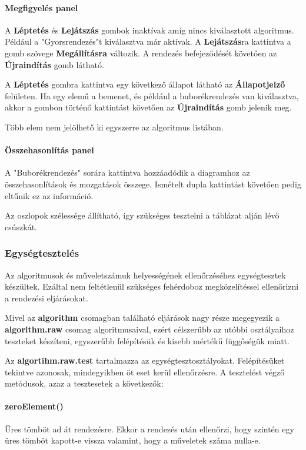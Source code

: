 \documentclass{elteikthesis}
\begin{document}
\paragraph{Megfigyelés panel}
A \textbf{Léptetés} és \textbf{Lejátszás} gombok inaktívak amíg nincs kiválasztott algoritmus. Például a "Gyorsrendezés"t kiválasztva már aktívak. A \textbf{Lejátszás}ra kattintva a gomb szövege \textbf{Megállításra} változik. A rendezés befejeződését követően az \textbf{Újraindítás} gomb látható. 
\par A \textbf{Léptetés} gombra kattintva egy következő állapot látható az \textbf{Állapotjelző} felületen. Ha egy elemű a bemenet, és például a buborékrendezés van kiválasztva, akkor a gombon történő kattintást követően az \textbf{Újraindítás} gomb jelenik meg.
\par Több elem nem jelölhető ki egyszerre az algoritmus listában.
\paragraph{Összehasonlítás panel}
A "Buborékrendezés" sorára kattintva hozzáadódik a diagramhoz az összehasonlítások és mozgatások összege. Ismételt dupla kattintást követően pedig eltűnik ez az információ.\par
Az oszlopok szélessége állítható, így szükséges tesztelni a táblázat alján lévő csúszkát.
\subsubsection{Egységtesztelés}
Az algoritmusok és műveletszámuk helyességének ellenőrzéséhez egységtesztek készültek. Ezáltal nem feltétlenül szükséges fehérdoboz megközelítéssel ellenőrizni a rendezési eljárásokat.\par
 Mivel az \textbf{algorithm} csomagban található eljárások nagy része megegyezik a \textbf{algorithm.raw} csomag algoritmusaival, ezért célszerűbb az utóbbi osztályaihoz teszteket készíteni, egyszerűbb felépítésük és kisebb mértékű függőségük miatt. \par
 Az \textbf{algortihm.raw.test} tartalmazza az egységtesztosztályokat. Felépítésüket tekintve azonosak, mindegyikben öt eset kerül ellenőrzésre. A tesztelést végző metódusok, azaz a tesztesetek a következők:
 \paragraph{zeroElement()}
Üres tömböt ad át rendezésre. Ekkor a rendezés után ellenőrzi, hogy szintén egy üres tömböt kapott-e vissza valamint, hogy a műveletek száma nulla-e.
\end{document}
